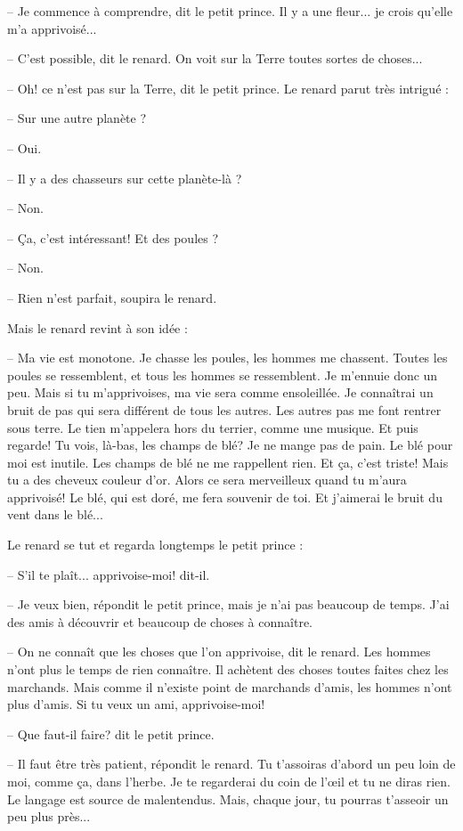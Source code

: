 \documentclass[a4paper]{report}
\begin{document}
-- Je commence à comprendre, dit le petit prince. Il y a une fleur... je crois qu'elle m'a apprivoisé...

-- C'est possible, dit le renard. On voit sur la Terre toutes sortes de choses...

-- Oh! ce n'est pas sur la Terre, dit le petit prince. Le renard parut très intrigué :

-- Sur une autre planète ?

-- Oui.

-- Il y a des chasseurs sur cette planète-là ?

-- Non.

-- Ça, c'est intéressant! Et des poules ?

-- Non.

-- Rien n'est parfait, soupira le renard.

Mais le renard revint à son idée :

-- Ma vie est monotone. Je chasse les poules, les hommes me chassent. Toutes les poules se ressemblent, et tous les hommes se ressemblent. Je m'ennuie donc un peu. Mais si tu m'apprivoises, ma vie sera comme ensoleillée. Je connaîtrai un bruit de pas qui sera différent de tous les autres. Les autres pas me font rentrer sous terre. Le tien m'appelera hors du terrier, comme une musique. Et puis regarde! Tu vois, là-bas, les champs de blé? Je ne mange pas de pain. Le blé pour moi est inutile. Les champs de blé ne me rappellent rien. Et ça, c'est triste! Mais tu a des cheveux couleur d'or. Alors ce sera merveilleux quand tu m'aura apprivoisé! Le blé, qui est doré, me fera souvenir de toi. Et j'aimerai le bruit du vent dans le blé...

Le renard se tut et regarda longtemps le petit prince :

-- S'il te plaît... apprivoise-moi! dit-il.

-- Je veux bien, répondit le petit prince, mais je n'ai pas beaucoup de temps. J'ai des amis à découvrir et beaucoup de choses à connaître.

-- On ne connaît que les choses que l'on apprivoise, dit le renard. Les hommes n'ont plus le temps de rien connaître. Il achètent des choses toutes faites chez les marchands. Mais comme il n'existe point de marchands d'amis, les hommes n'ont plus d'amis. Si tu veux un ami, apprivoise-moi!

-- Que faut-il faire? dit le petit prince.

-- Il faut être très patient, répondit le renard. Tu t'assoiras d'abord un peu loin de moi, comme ça, dans l'herbe. Je te regarderai du coin de l'œil et tu ne diras rien. Le langage est source de malentendus. Mais, chaque jour, tu pourras t'asseoir un peu plus près...
\end{document}
